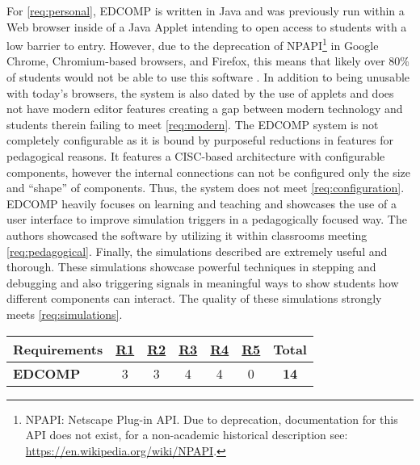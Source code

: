 For \cref{req:personal}, EDCOMP is written in Java and was previously run within a Web browser inside of a Java Applet intending to open access to students with a low barrier to entry. However, due to the deprecation of NPAPI\footnote{NPAPI: Netscape Plug-in API. Due to deprecation, documentation for this API does not exist, for a non-academic historical description see: \url{https://en.wikipedia.org/wiki/NPAPI}.} in Google Chrome, Chromium-based browsers, and Firefox, this means that likely over 80\% of students would not be able to use this software \cite{StatCounterBrowsers2017, W3SchoolsBrowsers2017, OracleJavaApplet2017, ChromiumBlogNPAPI2013, MozillaBlogNPAPI2016, GoogleChromeHelp2015}. In addition to being unusable with today's browsers, the system is also dated by the use of applets and does not have modern editor features creating a gap between modern technology and students therein failing to meet \cref{req:modern}. The EDCOMP system is not completely configurable as it is bound by purposeful reductions in features for pedagogical reasons. It features a CISC-based architecture with configurable components, however the internal connections can not be configured only the size and ``shape'' of components. Thus, the system does not meet \cref{req:configuration}. EDCOMP heavily focuses on learning and teaching and showcases the use of a user interface to improve simulation triggers in a pedagogically focused way. The authors showcased the software by utilizing it within classrooms meeting \cref{req:pedagogical}. Finally, the simulations described are extremely useful and thorough. These simulations showcase powerful techniques in stepping and debugging and also triggering signals in meaningful ways to show students how different components can interact. The quality of these simulations strongly meets \cref{req:simulations}. 

\begin{table}[h!]
    \centering
    \begin{tabular}{lcccccc}
       \textbf{Requirements} & \textbf{\hyperref[req:personal]{R1}} & \textbf{\hyperref[req:configuration]{R2}} & \textbf{\hyperref[req:pedagogical]{R3}} & \textbf{\hyperref[req:simulations]{R4}} & \textbf{\hyperref[req:modern]{R5}} & \textbf{Total} \\ \hline
       \textbf{EDCOMP \cite{Djordjevic2005}} 
       & 3 & 3 & 4 & 4 & 0 & \textbf{14} \\ 
    \end{tabular}
\end{table}

